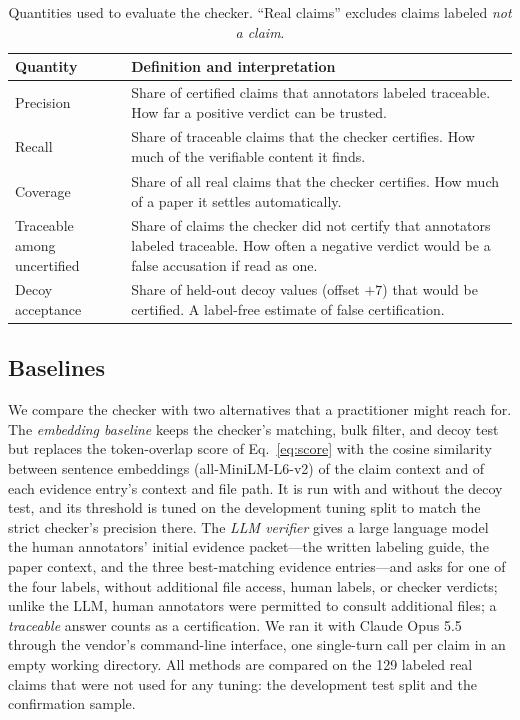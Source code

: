 \documentclass[preprint,12pt,authoryear]{elsarticle}
\begin{document}
\begin{table}[t]
\centering
\caption{Quantities used to evaluate the checker. ``Real claims'' excludes claims labeled \emph{not a claim}.}
\label{tab:metrics}
\footnotesize
\begin{tabular}{@{}>{\raggedright\arraybackslash}p{3.0cm}>{\raggedright\arraybackslash}p{9.6cm}@{}}
\toprule
Quantity & Definition and interpretation\\
\midrule
Precision & Share of certified claims that annotators labeled traceable. How far a positive verdict can be trusted.\\
Recall & Share of traceable claims that the checker certifies. How much of the verifiable content it finds.\\
Coverage & Share of all real claims that the checker certifies. How much of a paper it settles automatically.\\
Traceable among uncertified & Share of claims the checker did not certify that annotators labeled traceable. How often a negative verdict would be a false accusation if read as one.\\
Decoy acceptance & Share of held-out decoy values (offset $+7$) that would be certified. A label-free estimate of false certification.\\
\bottomrule
\end{tabular}
\end{table}

\subsection{Baselines}\label{sec:baselines}

We compare the checker with two alternatives that a practitioner might reach for. The \emph{embedding baseline} keeps the checker's matching, bulk filter, and decoy test but replaces the token-overlap score of Eq.~\eqref{eq:score} with the cosine similarity between sentence embeddings (all-MiniLM-L6-v2) of the claim context and of each evidence entry's context and file path. It is run with and without the decoy test, and its threshold is tuned on the development tuning split to match the strict checker's precision there. The \emph{LLM verifier} gives a large language model the human annotators' initial evidence packet---the written labeling guide, the paper context, and the three best-matching evidence entries---and asks for one of the four labels, without additional file access, human labels, or checker verdicts; unlike the LLM, human annotators were permitted to consult additional files; a \emph{traceable} answer counts as a certification. We ran it with Claude Opus 5.5 through the vendor's command-line interface, one single-turn call per claim in an empty working directory. All methods are compared on the 129 labeled real claims that were not used for any tuning: the development test split and the confirmation sample.
\end{document}
